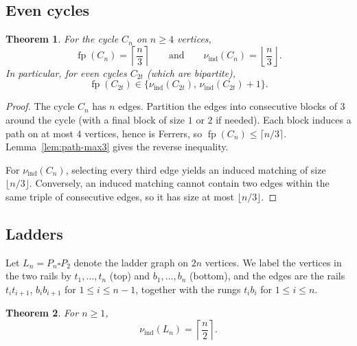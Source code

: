 \documentclass[12pt]{amsart}
\newtheorem{theorem}{Theorem}
\newcommand{\fp}{\operatorname{fp}}
\newcommand{\ind}{\operatorname{ind}}
\begin{document}
\subsection{Even cycles}

\begin{theorem}
\label{thm:cycle}
For the cycle $C_n$ on $n\ge 4$ vertices,
\[
\fp(C_n)=\left\lceil \frac{n}{3}\right\rceil
\qquad\text{and}\qquad
\nu_{\ind}(C_n)=\left\lfloor \frac{n}{3}\right\rfloor.
\]
In particular, for even cycles $C_{2t}$ (which are bipartite),
\[
\fp(C_{2t})\in\Big\{\nu_{\ind}(C_{2t}),\,\nu_{\ind}(C_{2t})+1\Big\}.
\]
\end{theorem}

\begin{proof}
The cycle $C_n$ has $n$ edges.
Partition the edges into consecutive blocks of $3$ around the cycle (with a final block of size $1$ or $2$ if needed).
Each block induces a path on at most $4$ vertices, hence is Ferrers, so $\fp(C_n)\le \lceil n/3\rceil$.
Lemma~\ref{lem:path-max3} gives the reverse inequality.

For $\nu_{\ind}(C_n)$, selecting every third edge yields an induced matching of size $\lfloor n/3\rfloor$.
Conversely, an induced matching cannot contain two edges within the same triple of consecutive edges, so it has size at most $\lfloor n/3\rfloor$.
\end{proof}

\subsection{Ladders}

Let $L_n=P_n\square P_2$ denote the ladder graph on $2n$ vertices.
We label the vertices in the two rails by $t_1,\dots,t_n$ (top) and $b_1,\dots,b_n$ (bottom),
and the edges are the rails $t_it_{i+1}$, $b_ib_{i+1}$ for $1\le i\le n-1$, together with the rungs $t_ib_i$ for
$1\le i\le n$.

\begin{theorem}\label{thm:nuind-ladder}
For $n\ge 1$,
\[
\nu_{\ind}(L_n)=\left\lceil\frac{n}{2}\right\rceil.
\]
\end{theorem}
\end{document}
